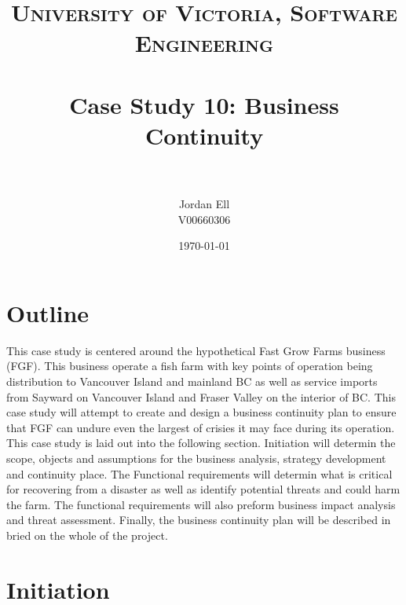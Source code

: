 \documentclass[paper=a4, fontsize=11pt]{scrartcl} %
\title{	
\normalfont \normalsize 
\textsc{University of Victoria, Software Engineering} \\ [25pt] %
\horrule{0.5pt} \\[0.4cm] %
\huge Case Study 10: Business Continuity \\ %
\horrule{2pt} \\[0.5cm] %
}
\author{Jordan Ell \\ V00660306} %
\date{\normalsize\today} %
\numberwithin{equation}{section} %
\numberwithin{figure}{section} %
\numberwithin{table}{section} %
\begin{document}
\maketitle %


\section{Outline}

This case study is centered around the hypothetical Fast Grow Farms business (FGF). This
business operate a fish farm with key points of operation being distribution to Vancouver
Island and mainland BC as well as service imports from Sayward on Vancouver Island
and Fraser Valley on the interior of BC. This case study will attempt to create and design
a business continuity plan to ensure that FGF can undure even the largest of crisies it
may face during its operation.\\

This case study is laid out into the following section. Initiation will determin the scope,
objects and assumptions for the business analysis, strategy development and continuity
place. The  Functional requirements will determin what is critical for recovering from a
disaster as well as identify potential threats and could harm the farm. The functional
requirements will also preform business impact analysis and threat assessment. Finally,
the business continuity plan will be described in bried on the whole of the project.



\section{Initiation}
\end{document}
